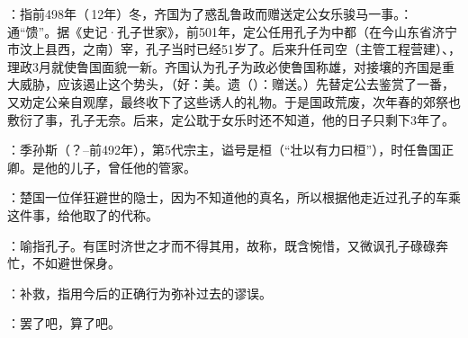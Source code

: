 {
\item {}：指前498年（\,12年）冬，齐国为了惑乱鲁政而赠送定公女乐骏马一事。：通“馈”。据《史记·孔子世家》，前501年，定公任用孔子为中都（在今山东省济宁市汶上县西，之南）宰，孔子当时已经51岁了。后来升任司空（主管工程营建）、，理政3月就使鲁国面貌一新。齐国认为孔子为政必使鲁国称雄，对接壤的齐国是重大威胁，应该遏止这个势头，（好：美。遗（）：赠送。）先替定公去鉴赏了一番，又劝定公亲自观摩，最终收下了这些诱人的礼物。于是国政荒废，次年春的郊祭也敷衍了事，孔子无奈。后来，定公耽于女乐时还不知道，他的日子只剩下3年了。

\item {}：季孙斯（？--前492年），第5代宗主，谥号是桓（“壮以有力曰桓”），时任鲁国正卿。是他的儿子，曾任他的管家。
}
{}


{
\item {}：楚国一位佯狂避世的隐士，因为不知道他的真名，所以根据他走近过孔子的车乘这件事，给他取了的代称。
\item {}：喻指孔子。有匡时济世之才而不得其用，故称，既含惋惜，又微讽孔子碌碌奔忙，不如避世保身。%
\item {}：补救，指用今后的正确行为弥补过去的谬误。
\item {}：罢了吧，算了吧。
}
{}


